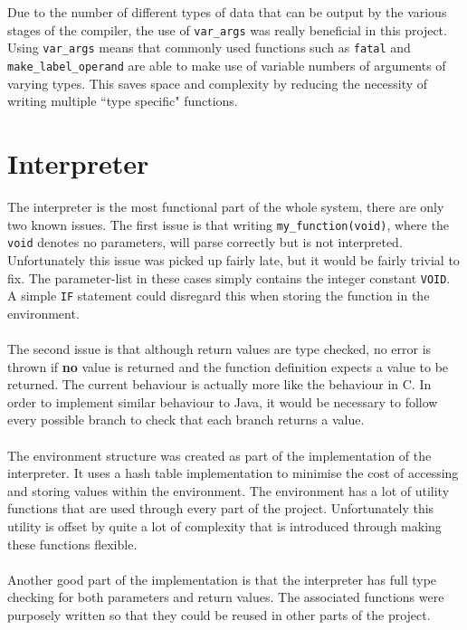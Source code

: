 \ \\ \ \\
Due to the number of different types of data that can be output by the various stages of the compiler, the use of \verb!var_args! was really beneficial in this project. Using \verb!var_args! means that commonly used functions such as \verb!fatal! and \verb!make_label_operand! are able to make use of variable numbers of arguments of varying types. This saves space and complexity by reducing the necessity of writing multiple ``type specific" functions.

\section{Interpreter}
The interpreter is the most functional part of the whole system, there are only two known issues. The first issue is that writing \verb!my_function(void)!, where the \verb!void! denotes no parameters, will parse correctly but is not interpreted. Unfortunately this issue was picked up fairly late, but it would be fairly trivial to fix. The parameter-list in these cases simply contains the integer constant \verb!VOID!. A simple \verb!IF! statement could disregard this when storing the function in the environment.
\ \\ \ \\
The second issue is that although return values are type checked, no error is thrown if \textbf{no} value is returned and the function definition expects a value to be returned. The current behaviour is actually more like the behaviour in C. In order to implement similar behaviour to Java, it would be necessary to follow every possible branch to check that each branch returns a value.
\ \\ \ \\
The environment structure was created as part of the implementation of the interpreter. It uses a hash table implementation to minimise the cost of accessing and storing values within the environment. The environment has a lot of utility functions that are used through every part of the project. Unfortunately this utility is offset by quite a lot of complexity that is introduced through making these functions flexible.
\ \\ \ \\
Another good part of the implementation is that the interpreter has full type checking for both parameters and return values. The associated functions were purposely written so that they could be reused in other parts of the project. 
